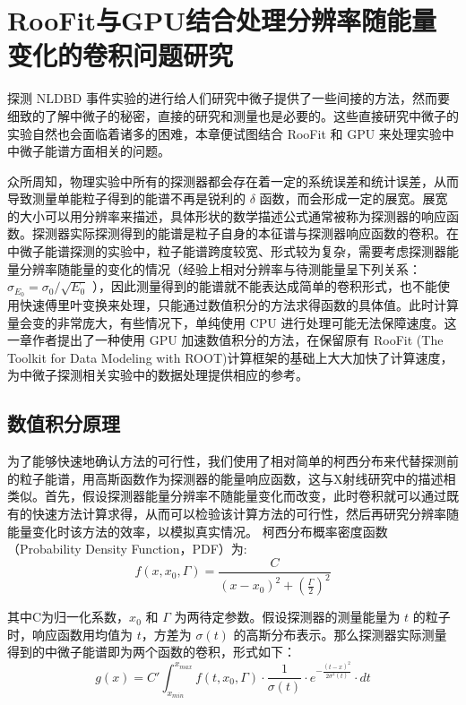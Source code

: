 \chapter{RooFit与GPU结合处理分辨率随能量变化的卷积问题研究}

探测 NLDBD 事件实验的进行给人们研究中微子提供了一些间接的方法，然而要细致的了解中微子的秘密，直接的研究和测量也是必要的。这些直接研究中微子的实验自然也会面临着诸多的困难，本章便试图结合 RooFit 和 GPU 来处理实验中中微子能谱方面相关的问题。

众所周知，物理实验中所有的探测器都会存在着一定的系统误差和统计误差，从而导致测量单能粒子得到的能谱不再是锐利的 $\delta$ 函数，而会形成一定的展宽。展宽的大小可以用分辨率来描述，具体形状的数学描述公式通常被称为探测器的响应函数。探测器实际探测得到的能谱是粒子自身的本征谱与探测器响应函数的卷积。在中微子能谱探测的实验中，粒子能谱跨度较宽、形式较为复杂\supercite{qian2015neutrino}，需要考虑探测器能量分辨率随能量的变化的情况（经验上相对分辨率与待测能量呈下列关系： $\sigma_{E_0}=\sigma_0/\sqrt{E_0}$ ）\supercite{leo2012techniques}，因此测量得到的能谱就不能表达成简单的卷积形式，也不能使用快速傅里叶变换来处理\supercite{mathworld}，只能通过数值积分的方法求得函数的具体值。此时计算量会变的非常庞大，有些情况下，单纯使用 CPU 进行处理可能无法保障速度。这一章作者提出了一种使用 GPU 加速数值积分的方法，在保留原有 RooFit (The Toolkit for Data Modeling with ROOT)\supercite{roofit}计算框架的基础上大大加快了计算速度，为中微子探测相关实验中的数据处理提供相应的参考。

\section{数值积分原理}

为了能够快速地确认方法的可行性，我们使用了相对简单的柯西分布来代替探测前的粒子能谱，用高斯函数作为探测器的能量响应函数，这与X射线研究中的描述相类似\supercite{wang2006cmga}。首先，假设探测器能量分辨率不随能量变化而改变，此时卷积就可以通过既有的快速方法计算求得，从而可以检验该计算方法的可行性，然后再研究分辨率随能量变化时该方法的效率，以模拟真实情况。
柯西分布概率密度函数（Probability Density Function，PDF）为:
\begin{equation}
    f(x,x_0,\Gamma)=\frac{C}{(x-x_0)^2+(\frac{\Gamma}{2})^2}
\end{equation}

其中C为归一化系数，$x_0$ 和 $\Gamma$ 为两待定参数。假设探测器的测量能量为 $t$ 的粒子时，响应函数用均值为 $t$，方差为 $\sigma(t)$ 的高斯分布表示。那么探测器实际测量得到的中微子能谱即为两个函数的卷积，形式如下：
\begin{equation}
    g(x)=C'\int_{x_{min}}^{x_{max}}f(t,x_0,\Gamma)\cdot\frac{1}{\sigma(t)}\cdot e^{-\frac{(t-x)^2}{2\sigma^2(t)}}\cdot dt 
\end{equation}

